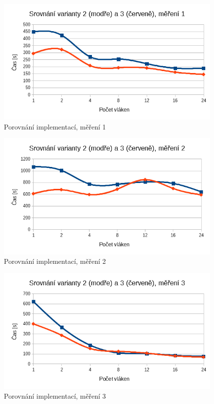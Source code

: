 \documentclass[12pt]{article}
\begin{document}
\begin{figure}
  \begin{center}
      \includegraphics[width=12cm]{images/vs1.png}	
    \caption{Porovnání implementací, měření 1} 
  \end{center}
\end{figure}

\begin{figure}
  \begin{center}
      \includegraphics[width=12cm]{images/vs2.png}	
    \caption{Porovnání implementací, měření 2}
  \end{center}
\end{figure}

\begin{figure}
  \begin{center}
      \includegraphics[width=12cm]{images/vs3.png}	
    \caption{Porovnání implementací, měření 3}
  \end{center}
\end{figure}
\end{document}
